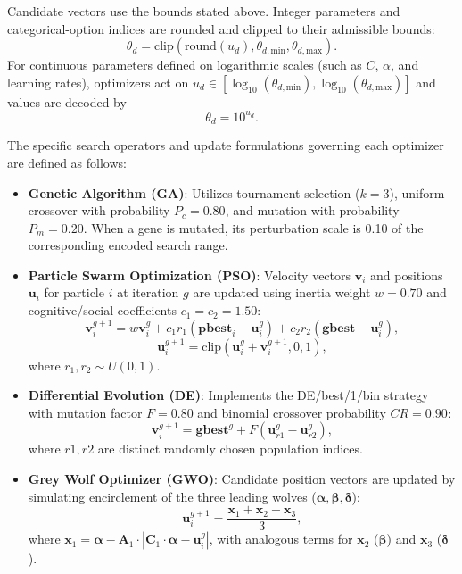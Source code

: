 Candidate vectors use the bounds stated above. Integer parameters and categorical-option indices are rounded and clipped to their admissible bounds:
\begin{equation}\label{eq:decoding_discrete}
\theta_d = \mathrm{clip}\!\left(\mathrm{round}(u_d),\theta_{d,\mathrm{min}},\theta_{d,\mathrm{max}}\right).
\end{equation}
For continuous parameters defined on logarithmic scales (such as $C$, $\alpha$, and learning rates), optimizers act on $u_d\in[\log_{10}(\theta_{d,\mathrm{min}}),\log_{10}(\theta_{d,\mathrm{max}})]$ and values are decoded by
\begin{equation}\label{eq:decoding_log}
\theta_d = 10^{u_d}.
\end{equation}

The specific search operators and update formulations governing each optimizer are defined as follows:
\begin{itemize}
    \item \textbf{Genetic Algorithm (GA)}: Utilizes tournament selection ($k=3$), uniform crossover with probability $P_c = 0.80$, and mutation with probability $P_m = 0.20$. When a gene is mutated, its perturbation scale is 0.10 of the corresponding encoded search range.
    \item \textbf{Particle Swarm Optimization (PSO)}: Velocity vectors $\mathbf{v}_i$ and positions $\mathbf{u}_i$ for particle $i$ at iteration $g$ are updated using inertia weight $w = 0.70$ and cognitive/social coefficients $c_1 = c_2 = 1.50$:
    \begin{equation}\label{eq:pso_update}
    \mathbf{v}_i^{g+1} = w \mathbf{v}_i^g + c_1 r_1 (\mathbf{pbest}_i - \mathbf{u}_i^g) + c_2 r_2 (\mathbf{gbest} - \mathbf{u}_i^g),
    \end{equation}
    \begin{equation}
    \mathbf{u}_i^{g+1} = \mathrm{clip}\left(\mathbf{u}_i^g + \mathbf{v}_i^{g+1}, 0, 1\right),
    \end{equation}
    where $r_1, r_2 \sim U(0, 1)$.
    \item \textbf{Differential Evolution (DE)}: Implements the DE/best/1/bin strategy with mutation factor $F = 0.80$ and binomial crossover probability $CR = 0.90$:
    \begin{equation}\label{eq:de_update}
    \mathbf{v}_i^{g+1} = \mathbf{gbest}^g + F (\mathbf{u}_{r1}^g - \mathbf{u}_{r2}^g),
    \end{equation}
    where $r1, r2$ are distinct randomly chosen population indices.
    \item \textbf{Grey Wolf Optimizer (GWO)}: Candidate position vectors are updated by simulating encirclement of the three leading wolves ($\bm{\alpha}, \bm{\beta}, \bm{\delta}$):
    \begin{equation}\label{eq:gwo_update}
    \mathbf{u}_i^{g+1} = \frac{\mathbf{x}_1 + \mathbf{x}_2 + \mathbf{x}_3}{3},
    \end{equation}
    where $\mathbf{x}_1 = \bm{\alpha} - \mathbf{A}_1 \cdot |\mathbf{C}_1 \cdot \bm{\alpha} - \mathbf{u}_i^g|$, with analogous terms for $\mathbf{x}_2$ ($\bm{\beta}$) and $\mathbf{x}_3$ ($\bm{\delta}$).
\end{itemize}

